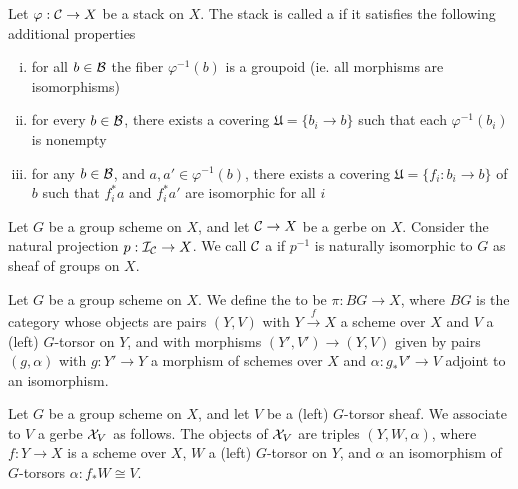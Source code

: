 \begin{defn}
Let $\varphi: \mathcal{C}\rightarrow X$ be a stack on $X$.  The stack is called a  if it satisfies the following additional properties
\begin{enumerate}[(i)]
\item  for all $b\in\mathcal{B}$ the fiber $\varphi^{-1}(b)$ is a groupoid (ie. all morphisms are isomorphisms)
\item  for every $b\in \mathcal{B}$, there exists a covering $\mathfrak U = \{b_i\rightarrow b\}$ such that each $\varphi^{-1}(b_i)$ is nonempty
\item  for any $b\in\mathcal{B}$, and $a,a'\in \varphi^{-1}(b)$, there exists a covering $\mathfrak U=\{f_i: b_i\rightarrow b\}$ of $b$ such that $f_i^*a$ and $f_i^*a'$ are isomorphic for all $i$
\end{enumerate}
\end{defn}

\begin{defn}
Let $G$ be a group scheme on $X$, and let $\mathcal{C}\rightarrow X$ be a gerbe on $X$.  Consider the natural projection $p: \mathcal{I}_{\mathcal{C}}\rightarrow X$.  We call $\mathcal{C}$ a  if $p^{-1}$ is naturally isomorphic to $G$ as sheaf of groups on $X$.
\end{defn}

\begin{ex}
Let $G$ be a group scheme on $X$.  We define the  to be $\pi: BG\rightarrow X$, where $BG$ is the category whose objects are pairs $(Y,V)$ with $Y\xrightarrow{f}X$ a scheme over $X$ and $V$ a (left) $G$-torsor on $Y$, and with morphisms $(Y',V')\rightarrow (Y,V)$ given by pairs $(g,\alpha)$ with $g: Y'\rightarrow Y$ a morphism of schemes over $X$ and $\alpha: g_*V'\rightarrow V$ adjoint to an isomorphism.
\end{ex}

\begin{ex}
Let $G$ be a group scheme on $X$, and let $V$ be a (left) $G$-torsor sheaf.  We associate to $V$ a gerbe $\mathcal{X}_V$ as follows.  The objects of $\mathcal{X}_V$ are triples $(Y,W,\alpha)$, where $f:Y\rightarrow X$ is a scheme over $X$, $W$ a (left) $G$-torsor on $Y$, and $\alpha$ an isomorphism of $G$-torsors $\alpha: f_*W\cong V$.
\end{ex}

